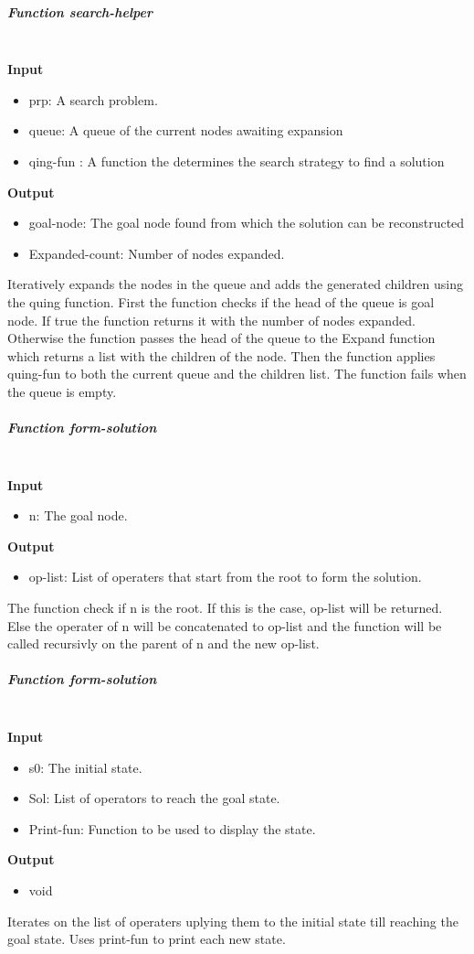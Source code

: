 \documentclass[paper=a4, fontsize=11pt]{scrartcl}
\numberwithin{equation}{section}		%
\numberwithin{figure}{section}			%
\numberwithin{table}{section}				%
\begin{document}
\subparagraph{Function search-helper } \mbox{} \\
\noindent\textbf{Input}
\begin{itemize}
    \item prp: A search problem.
    \item queue: A queue of the current nodes awaiting expansion
    \item qing-fun : A function the determines the search strategy to find a solution
\end{itemize}
\noindent\textbf{Output}
\begin{itemize}
    \item goal-node: The goal node found from which the solution can be reconstructed
    \item Expanded-count: Number of nodes expanded.
\end{itemize}
Iteratively expands the nodes in the queue and adds the generated children using the quing function. First the function checks if the head of the queue is goal node. If true the function returns it with the number of nodes expanded. Otherwise the function passes the head of the queue to the Expand function  which returns a list with the children of the node. Then the function applies quing-fun to both the current queue and the children list. The function fails when the queue is empty.

\subparagraph{Function form-solution } \mbox{} \\
\noindent\textbf{Input}
\begin{itemize}
    \item n: The goal node.
\end{itemize}
\noindent\textbf{Output}
\begin{itemize}
    \item op-list: List of operaters that start from the root to form the solution.
\end{itemize}
The function check if n is the root. If this is the case, op-list will be returned. Else the operater of n will be concatenated to op-list and the function will be called recursivly on the parent of n and the new op-list.

\subparagraph{Function form-solution } \mbox{} \\
\noindent\textbf{Input}
\begin{itemize}
    \item  s0: The initial state.
    \item Sol: List of operators to reach the goal state.
    \item Print-fun: Function to be used to display the state.
\end{itemize}
\noindent\textbf{Output}
\begin{itemize}
    \item void
\end{itemize}
Iterates on the list of operaters uplying them to the initial state till reaching the goal state. Uses print-fun to print each new state.
\end{document}

